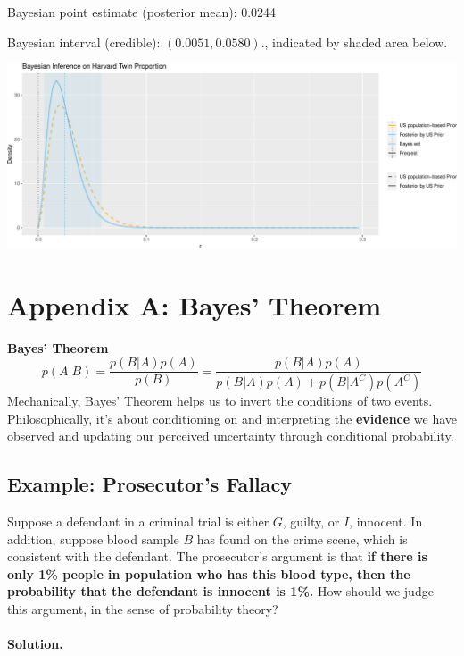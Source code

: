 \documentclass[
]{book}
\begin{document}
Bayesian point estimate (posterior mean): 0.0244

Bayesian interval (credible): \((0.0051, 0.0580).\), indicated by shaded area below.

\includegraphics{_main_files/figure-latex/unnamed-chunk-8-1.pdf}

\hypertarget{appendix-a-bayes-theorem}{%
\section{Appendix A: Bayes' Theorem}\label{appendix-a-bayes-theorem}}

\textbf{Bayes' Theorem}
\[
p(A|B) = \frac{p(B|A)p(A)}{p(B)} = \frac{p(B|A)p(A)}{p(B|A)p(A) + p(B|A^C)p(A^C)}
\]
Mechanically, Bayes' Theorem helps us to invert the conditions of two events. Philosophically, it's about conditioning on and interpreting the \textbf{evidence} we have observed and updating our perceived uncertainty through conditional probability.

\hypertarget{example-prosecutors-fallacy}{%
\subsection{Example: Prosecutor's Fallacy}\label{example-prosecutors-fallacy}}

Suppose a defendant in a criminal trial is either \(G\), guilty, or \(I\), innocent. In addition, suppose blood sample \(B\) has found on the crime scene, which is consistent with the defendant. The prosecutor's argument is that \textbf{if there is only 1\% people in population who has this blood type, then the probability that the defendant is innocent is 1\%.} How should we judge this argument, in the sense of probability theory?

\paragraph{Solution.}
\end{document}
